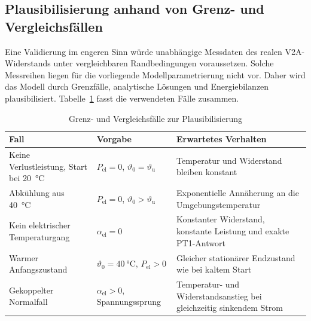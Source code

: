 \subsection{Plausibilisierung anhand von Grenz- und Vergleichsfällen}
\label{sec:plausibilisierung_teilmodelle}

Eine Validierung im engeren Sinn würde unabhängige Messdaten des realen
V2A-Widerstands unter vergleichbaren Randbedingungen voraussetzen. Solche
Messreihen liegen für die vorliegende Modellparametrierung nicht vor. Daher
wird das Modell durch Grenzfälle, analytische Lösungen und Energiebilanzen
plausibilisiert. Tabelle~\ref{tab:modell_plausibilisierungsfaelle} fasst die
verwendeten Fälle zusammen.

\begin{table}[H]
    \centering
    \caption{Grenz- und Vergleichsfälle zur Plausibilisierung}
    \label{tab:modell_plausibilisierungsfaelle}
    \begin{tabular}{p{}p{}p{}}
        \toprule
        Fall & Vorgabe & Erwartetes Verhalten \\
        \midrule
        Keine Verlustleistung, Start bei \SI{20}{\degreeCelsius}
            & \(P_{\mathrm{el}}=0\),
              \(\vartheta_0=\vartheta_{\mathrm{u}}\)
            & Temperatur und Widerstand bleiben konstant \\
        Abkühlung aus \SI{40}{\degreeCelsius}
            & \(P_{\mathrm{el}}=0\),
              \(\vartheta_0>\vartheta_{\mathrm{u}}\)
            & Exponentielle Annäherung an die Umgebungstemperatur \\
        Kein elektrischer Temperaturgang
            & \(\alpha_{\mathrm{el}}=0\)
            & Konstanter Widerstand, konstante Leistung und exakte PT1-Antwort \\
        Warmer Anfangszustand
            & \(\vartheta_0=\SI{40}{\degreeCelsius}\),
              \(P_{\mathrm{el}}>0\)
            & Gleicher stationärer Endzustand wie bei kaltem Start \\
        Gekoppelter Normalfall
            & \(\alpha_{\mathrm{el}}>0\),
              Spannungssprung
            & Temperatur- und Widerstandsanstieg bei gleichzeitig sinkendem Strom \\
        \bottomrule
    \end{tabular}
\end{table}

